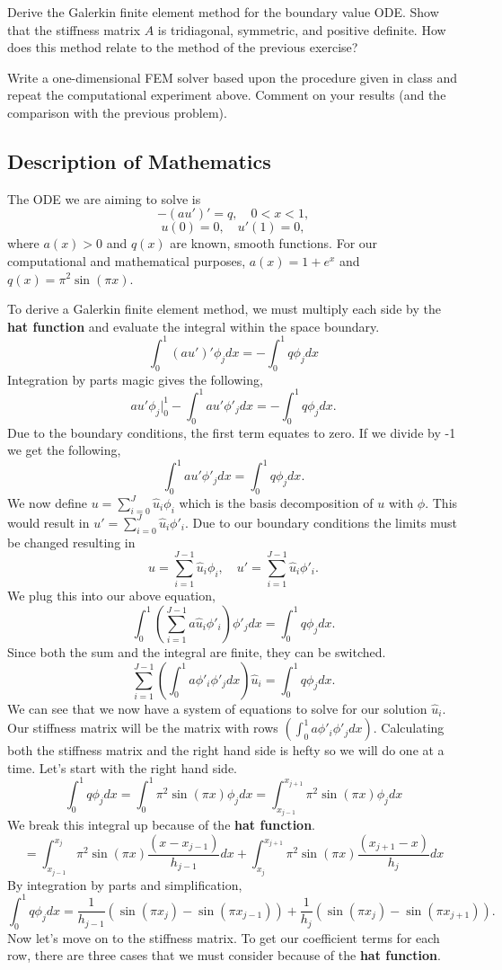\documentclass[11pt, oneside]{article}   	%
\begin{document}
\begin{enumerate}
Derive the Galerkin finite element method for the boundary value ODE. Show that the stiffness matrix $A$ is tridiagonal, symmetric, and positive definite. How does this method relate to the method of the previous exercise?

Write a one-dimensional FEM solver based upon the procedure given in class and repeat the computational experiment above. Comment on your results (and the comparison with the previous problem).

\subsection{Description of Mathematics}

The ODE we are aiming to solve is
\[
-(au')' = q, \quad 0 < x < 1,
\]
\[
u(0) = 0, \quad u'(1) = 0,
\]
where $a(x) > 0$ and $q(x)$ are known, smooth functions. For our computational and mathematical purposes, $a(x) = 1+ e^x$ and $q(x) = \pi^2 \sin(\pi x)$. 

To derive a Galerkin finite element method, we must multiply each side by the \textbf{hat function} and evaluate the integral within the space boundary.
\[
\int_0^1 (au')' \phi_j dx = -\int_0^1 q \phi_j dx
\]
Integration by parts magic gives the following,
\[
au' \phi_j \big |_0^1 - \int_0^1 au' \phi'_j dx = -\int_0^1 q \phi_j dx.
\]
Due to the boundary conditions, the first term equates to zero. If we divide by -1 we get the following,
\[
\int_0^1 au' \phi'_j dx = \int_0^1 q \phi_j dx.
\]
We now define $u = \sum \limits_{i=0}^J \hat u_i \phi_i$ which is the basis decomposition of $u$ with $\phi$. This would result in $u' = \sum \limits_{i=0}^J \hat u_i \phi'_i$. Due to our boundary conditions the limits must be changed resulting in
\[
u = \sum \limits_{i=1}^{J-1} \hat u_i \phi_i, \quad u' = \sum \limits_{i=1}^{J-1} \hat u_i \phi'_i.
\]
We plug this into our above equation,
\[
\int_0^1 \left(\sum \limits_{i = 1}^{J-1} a \hat u_i \phi'_i \right)\phi'_j dx = \int_0^1 q \phi_j dx.
\]
Since both the sum and the integral are finite, they can be switched.
\[
\sum \limits_{i = 1}^{J-1} \left(\int_0^1 a \phi'_i \phi'_j dx\right) \hat u_i = \int_0^1 q \phi_j dx.
\]
We can see that we now have a system of equations to solve for our solution $\hat u_i$. Our stiffness matrix will be the matrix with rows $\left(\int_0^1 a \phi'_i \phi'_j dx\right)$. Calculating both the stiffness matrix and the right hand side is hefty so we will do one at a time. Let's start with the right hand side.
\[
\int_0^1 q \phi_j dx = \int_0^1 \pi^2 \sin(\pi x) \phi_j dx = \int_ {x_{j-1}}^{x_{j+1}} \pi^2 \sin(\pi x) \phi_j dx
\]
We break this integral up because of the \textbf{hat function}.
\[
=\int_ {x_{j-1}}^{x_{j}} \pi^2 \sin(\pi x) \frac{(x - x_{j-1})}{h_{j-1}} dx + \int_ {x_{j}}^{x_{j+1}} \pi^2 \sin(\pi x)\frac{(x_{j+1} - x)}{h_j}dx
\]
By integration by parts and simplification,
\[
\int_0^1 q \phi_j dx = \frac{1}{h_{j-1}} (\sin(\pi x_j) - \sin(\pi x_{j-1})) + \frac{1}{h_j} (\sin(\pi x_j) - \sin(\pi x_{j+1})).
\]
Now let's move on to the stiffness matrix. To get our coefficient terms for each row, there are three cases that we must consider because of the \textbf{hat function}.


\end{enumerate}
\end{document}
